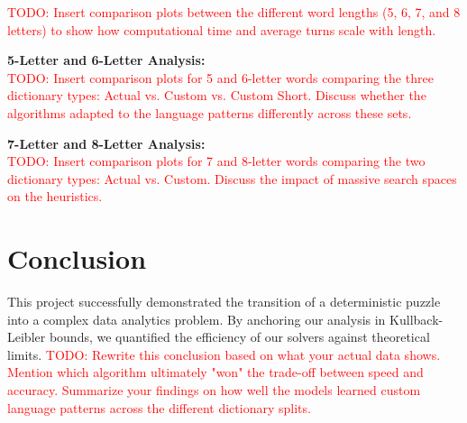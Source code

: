 \documentclass[12pt, a4paper]{article}
\begin{document}
\textcolor{red}{TODO: Insert comparison plots between the different word lengths (5, 6, 7, and 8 letters) to show how computational time and average turns scale with length.}

\vspace{0.5cm}
\noindent\textbf{5-Letter and 6-Letter Analysis:}\\
\textcolor{red}{TODO: Insert comparison plots for 5 and 6-letter words comparing the three dictionary types: Actual vs. Custom vs. Custom Short. Discuss whether the algorithms adapted to the language patterns differently across these sets.}

\vspace{0.5cm}
\noindent\textbf{7-Letter and 8-Letter Analysis:}\\
\textcolor{red}{TODO: Insert comparison plots for 7 and 8-letter words comparing the two dictionary types: Actual vs. Custom. Discuss the impact of massive search spaces on the heuristics.}

\section{Conclusion}
This project successfully demonstrated the transition of a deterministic puzzle into a complex data analytics problem. By anchoring our analysis in Kullback-Leibler bounds, we quantified the efficiency of our solvers against theoretical limits. \textcolor{red}{TODO: Rewrite this conclusion based on what your actual data shows. Mention which algorithm ultimately "won" the trade-off between speed and accuracy. Summarize your findings on how well the models learned custom language patterns across the different dictionary splits.}
\end{document}
